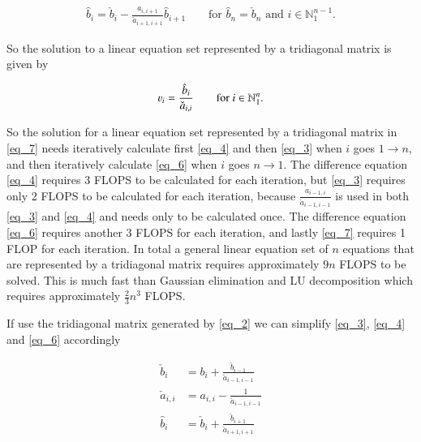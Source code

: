 \documentclass[11pt,english,a4paper]{article}
\begin{document}
\begin{flushleft}
\begin{align}
\hat b_i = \check b_i - \frac{a_{i,i+1}}{\check a_{i+1,i+1}} \hat b_{i+1} \qquad \text{for $\hat b_n = \check b_n$ and $i\in\mathbb{N}_1^{n-1}$.}
\label{eq_6}
\end{align}

So the solution to a linear equation set represented by a tridiagonal matrix is given by

\begin{align}
\varv_i = \frac{\hat b_i}{\check a_{i,i}} \qquad \text{for $i\in\mathbb{N}_1^n$.}
\label{eq_7}
\end{align}

So the solution for a linear equation set represented by a tridiagonal matrix in \eqref{eq_7} needs iteratively calculate first \eqref{eq_4} and then \eqref{eq_3} when $i$ goes $1\to n$, and then iteratively calculate \eqref{eq_6} when $i$ goes $n\to 1$. The difference equation \eqref{eq_4} requires 3 FLOPS to be calculated for each iteration, but \eqref{eq_3} requires only 2 FLOPS to be calculated for each iteration, because $\frac{a_{i-1,i}}{\check a_{i-1,i-1}}$ is used in both \eqref{eq_3} and \eqref{eq_4} and needs only to be calculated once. The difference equation \eqref{eq_6} requires another 3 FLOPS for each iteration, and lastly \eqref{eq_7} requires 1 FLOP for each iteration. In total a general linear equation set of $n$ equations that are represented by a tridiagonal matrix requires approximately $9n$ FLOPS to be solved. This is much fast than Gaussian elimination and LU decomposition which requires approximately $\frac{2}{3}n^3$ FLOPS. \linebreak

If use the tridiagonal matrix generated by \eqref{eq_2} we can simplify \eqref{eq_3}, \eqref{eq_4} and \eqref{eq_6} accordingly

\begin{align}
\check b_i &= b_i + \frac{\check b_{i-1}}{\check a_{i-1,i-1}}
\label{eq_8}
\\
\check a_{i,i} &= a_{i,i} - \frac{1}{\check a_{i-1,i-1}}
\label{eq_9}
\\
\hat b_i &= \check b_i + \frac{\check b_{i+1}}{\check a_{i+1,i+1}}
\label{eq_10}
\end{align}

\end{flushleft}
\end{document}
